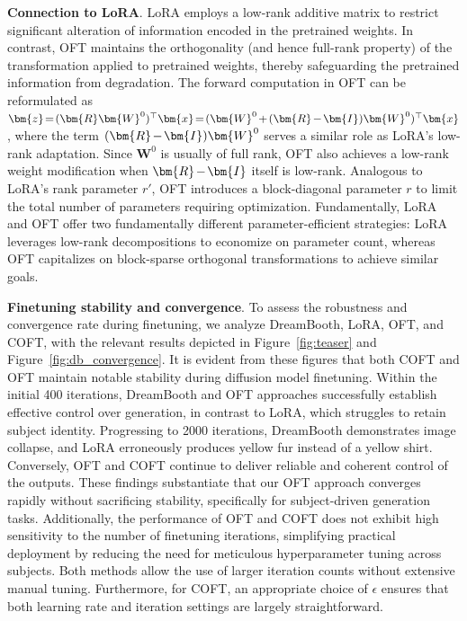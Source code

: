 \textbf{Connection to LoRA}. LoRA employs a low-rank additive matrix to restrict significant alteration of information encoded in the pretrained weights. In contrast, OFT maintains the orthogonality (and hence full-rank property) of the transformation applied to pretrained weights, thereby safeguarding the pretrained information from degradation. The forward computation in OFT can be reformulated as $\thickmuskip=2mu \medmuskip=2mu \bm{z}=(\bm{R}\bm{W}^0)^\top\bm{x}=(\bm{W}^0+(\bm{R}-\bm{I})\bm{W}^0)^\top\bm{x}$, where the term $\thickmuskip=2mu \medmuskip=2mu (\bm{R}-\bm{I})\bm{W}^0$ serves a similar role as LoRA’s low-rank adaptation. Since $\bm{W}^0$ is usually of full rank, OFT also achieves a low-rank weight modification when $\thickmuskip=2mu \medmuskip=2mu \bm{R}-\bm{I}$ itself is low-rank. Analogous to LoRA’s rank parameter $r'$, OFT introduces a block-diagonal parameter $r$ to limit the total number of parameters requiring optimization. Fundamentally, LoRA and OFT offer two fundamentally different parameter-efficient strategies: LoRA leverages low-rank decompositions to economize on parameter count, whereas OFT capitalizes on block-sparse orthogonal transformations to achieve similar goals.

\textbf{Finetuning stability and convergence}. To assess the robustness and convergence rate during finetuning, we analyze DreamBooth, LoRA, OFT, and COFT, with the relevant results depicted in Figure~\ref{fig:teaser} and Figure~\ref{fig:db_convergence}. It is evident from these figures that both COFT and OFT maintain notable stability during diffusion model finetuning. Within the initial 400 iterations, DreamBooth and OFT approaches successfully establish effective control over generation, in contrast to LoRA, which struggles to retain subject identity. Progressing to 2000 iterations, DreamBooth demonstrates image collapse, and LoRA erroneously produces yellow fur instead of a yellow shirt. Conversely, OFT and COFT continue to deliver reliable and coherent control of the outputs. These findings substantiate that our OFT approach converges rapidly without sacrificing stability, specifically for subject-driven generation tasks. Additionally, the performance of OFT and COFT does not exhibit high sensitivity to the number of finetuning iterations, simplifying practical deployment by reducing the need for meticulous hyperparameter tuning across subjects. Both methods allow the use of larger iteration counts without extensive manual tuning. Furthermore, for COFT, an appropriate choice of $\epsilon$ ensures that both learning rate and iteration settings are largely straightforward.

